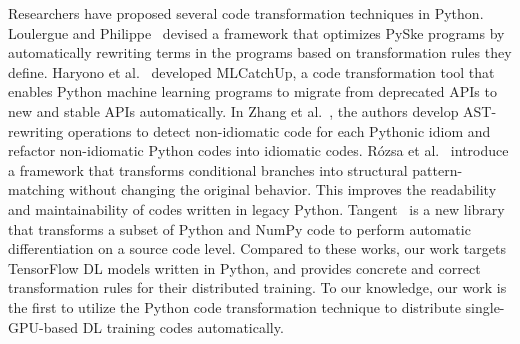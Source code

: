 Researchers have proposed several code transformation techniques in Python.
Loulergue and Philippe~\cite{loulergue2019automatic} devised a framework that optimizes
PySke programs by automatically rewriting terms in the programs based on
transformation rules they define.
Haryono et al.~\cite{haryono2021mlcatchup} developed MLCatchUp, a code transformation tool
that enables Python machine learning programs to migrate from deprecated APIs
to new and stable APIs automatically. 
In Zhang et al.~\cite{python-idiomatic}, the authors develop AST-rewriting 
operations to detect non-idiomatic code for each Pythonic idiom and refactor 
non-idiomatic Python codes into idiomatic codes.
Rózsa et al.~\cite{dont-diy} introduce a framework 
that transforms conditional branches into structural pattern-matching without
changing the original behavior. 
This improves the readability and maintainability of codes written in legacy Python.
Tangent~\cite{tangent} is a new library that transforms a subset of Python and NumPy code 
to perform automatic differentiation on a source code level.
Compared to these works, our work targets TensorFlow DL models written in
Python, and provides concrete and correct transformation rules for their
distributed training.
To our knowledge, our work is the first to utilize the Python code
transformation technique to distribute single-GPU-based DL
training codes automatically.

